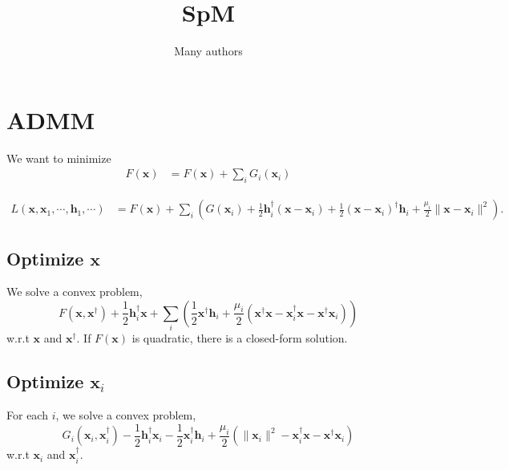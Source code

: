\documentclass[11pt]{article}
\title{SpM}
\author{Many authors}
\newcommand{\bx}{\ensuremath{\boldsymbol{x}}}
\newcommand{\bh}{\ensuremath{\boldsymbol{h}}}
\begin{document}
\maketitle

\section{ADMM}

We want to minimize
\begin{align}
    F(\bx) &= F(\bx) + \sum_i G_i(\bx_i)
\end{align}

\begin{align}
    L(\bx, \bx_1, \cdots, \bh_1, \cdots) &=
        F(\bx) + \sum_i \left(G(\bx_i) 
           + \frac{1}{2}\bh_i^\dagger (\bx - \bx_i) 
           + \frac{1}{2} (\bx - \bx_i)^\dagger \bh_i
           + \frac{\mu_i}{2}\|\bx - \bx_i\|^2\right).
\end{align}

\subsection{Optimize $\bx$}
We solve a convex problem,
\begin{equation}
    F(\bx, \bx^\dagger) + \frac{1}{2}\bh_i^\dagger \bx + \sum_i\left(\frac{1}{2}\bx^\dagger \bh_i  
       + \frac{\mu_i}{2}(\bx^\dagger \bx - \bx_i^\dagger \bx - \bx^\dagger \bx_i)\right)
\end{equation}
w.r.t $\bx$ and $\bx^\dagger$. If $F(\bx)$ is quadratic, there is a closed-form solution.

\subsection{Optimize $\bx_i$}
For each $i$, we solve a convex problem,
\begin{equation}
    G_i(\bx_i, \bx_i^\dagger) 
        - \frac{1}{2}\bh_i^\dagger \bx_i
        - \frac{1}{2}\bx_i^\dagger \bh_i
        + \frac{\mu_i}{2}(\|\bx_i\|^2 - \bx_i^\dagger \bx - \bx^\dagger \bx_i)
\end{equation}
w.r.t $\bx_i$ and $\bx_i^\dagger$.
\end{document}
